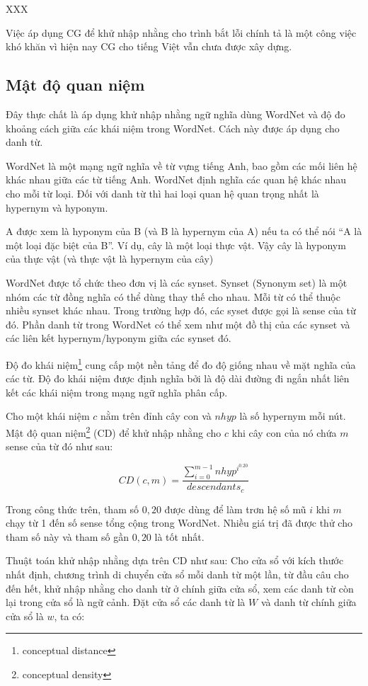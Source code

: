 \documentclass[a4paper,oneside,14pt]{extbook} %
\begin{document}
XXX %


Việc áp dụng CG để khử nhập nhằng cho trình bắt lỗi chính tả là một
công việc khó khăn vì hiện nay CG cho tiếng Việt vẫn chưa được xây
dựng. 

\subsection{Mật độ quan niệm}


Đây thực chất là áp dụng khử nhập nhằng ngữ nghĩa dùng
WordNet và độ đo khoảng cách giữa các khái niệm trong WordNet. Cách
này được áp dụng cho danh từ. 

WordNet là một mạng ngữ nghĩa về từ vựng tiếng Anh, bao gồm các mối
liên hệ khác nhau giữa các từ tiếng Anh. WordNet định nghĩa các quan
hệ khác nhau cho mỗi từ loại. Đối với danh từ thì hai loại quan hệ
quan trọng nhất là hypernym và hyponym. 

A được xem là hyponym của B
(và B là hypernym của A) nếu ta có thể nói ``A là một loại đặc biệt
của B''. Ví dụ, cây là một loại thực vật. Vậy cây là hyponym của thực
vật (và thực vật là hypernym của cây)

WordNet được tổ chức theo đơn vị là các synset. Synset
(Synonym set) là một nhóm các từ đồng nghĩa có thể dùng thay thế cho
nhau. Mỗi từ có thể thuộc nhiều synset khác nhau. Trong trường hợp đó,
các syset được gọi là sense của từ đó. Phần danh từ trong WordNet có
thể xem như một đồ thị của các synset và các liên kết hypernym/hyponym
giữa các synset đó.  

Độ đo khái niệm\footnote{conceptual distance} cung cấp một nền tảng để
đo độ giống nhau về mặt nghĩa của các từ. Độ đo khái niệm được định
nghĩa bởi \cite{Rada} là độ dài đường đi ngắn nhất liên kết các khái
niệm trong mạng ngữ nghĩa phân cấp.

Cho một khái niệm $c$ nằm trên đỉnh cây con và $nhyp$ là số hypernym
mỗi nút. Mật độ quan niệm\footnote{conceptual density} (CD) để khử nhập nhằng cho $c$ khi cây con của
nó chứa $m$ sense của từ đó  như sau:

$$CD(c,m)=\frac{\displaystyle\sum^{m-1}_{i=0}nhyp^{i^{0.20}}}{descendants_c}$$

Trong công thức trên, tham số $0,20$ được dùng để làm trơn hệ số mũ
$i$ khi $m$ chạy từ 1 đến số sense tổng cộng trong WordNet. Nhiều giá
trị đã được thử cho tham số này và tham số gần $0,20$ là tốt nhất.


Thuật toán khử nhập nhằng dựa trên CD như sau: Cho cửa sổ với kích
thước nhất định, chương trình di chuyển cửa sổ mỗi 
danh từ một lần, từ đầu câu cho đến hết, khử nhập nhằng cho danh từ ở
chính giữa cửa sổ, xem các danh từ còn lại trong cửa sổ là ngữ
cảnh. Đặt cửa sổ các danh từ là $W$ và danh từ chính giữa cửa sổ là
$w$, ta có:
\end{document}

